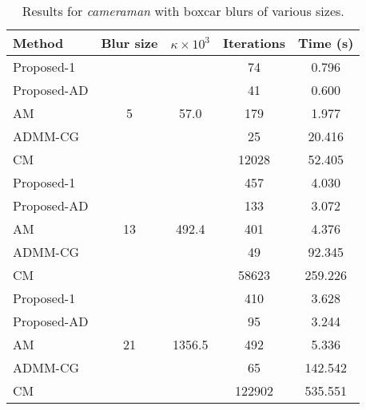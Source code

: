 \documentclass[10pt,twocolumn,twoside]{IEEEtran}
\begin{document}
\begin{table}[h]
	\renewcommand{\arraystretch}{1}
	\caption{Results for \textit{cameraman} with boxcar blurs of various sizes.}
	\centering
\begin{tabular}{l|c|c|c|c}
Method &Blur size &$\kappa \times 10^3$ &Iterations &Time (s) \\
\hline
Proposed-1 & \multirow{5}{*}{5} & \multirow{5}{*}{57.0} &   74 & 0.796  \\
Proposed-AD & & &   41 & 0.600 \\
AM & & &  179 & 1.977 \\
ADMM-CG & & &   25 & 20.416 \\
CM & & & 12028 & 52.405 \\
\hline
Proposed-1 & \multirow{5}{*}{13} & \multirow{5}{*}{492.4} &  457 & 4.030  \\
Proposed-AD & & &  133 & 3.072 \\
AM & & &  401 & 4.376 \\
ADMM-CG & & &   49 & 92.345 \\
CM & & & 58623 & 259.226 \\
\hline
Proposed-1 & \multirow{5}{*}{21} & \multirow{5}{*}{1356.5} &  410 & 3.628  \\
Proposed-AD & & &   95 & 3.244 \\
AM & & &  492 & 5.336 \\
ADMM-CG & & &   65 & 142.542 \\
CM & & & 122902 & 535.551 \\
\hline
\end{tabular}
\end{table}
\end{document}
